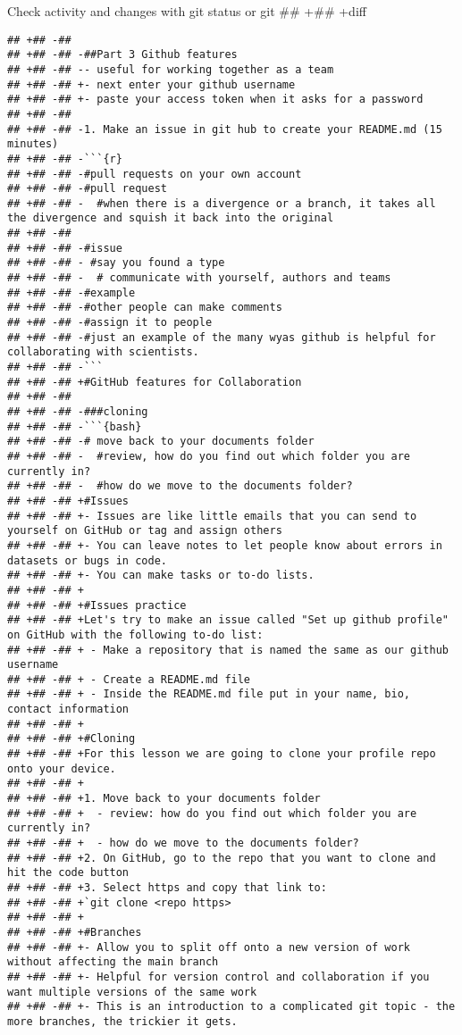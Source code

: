 \documentclass[ignorenonframetext,]{beamer}
\begin{document}
\begin{frame}[fragile]{Check activity and changes with git status or git
## +## +diff}
\begin{verbatim}
## +## -##  
## +## -## -##Part 3 Github features
## +## -## -- useful for working together as a team
## +## -## +- next enter your github username
## +## -## +- paste your access token when it asks for a password
## +## -##  
## +## -## -1. Make an issue in git hub to create your README.md (15 minutes)
## +## -## -```{r}
## +## -## -#pull requests on your own account 
## +## -## -#pull request 
## +## -## -  #when there is a divergence or a branch, it takes all the divergence and squish it back into the original
## +## -##  
## +## -## -#issue
## +## -## - #say you found a type
## +## -## -  # communicate with yourself, authors and teams 
## +## -## -#example
## +## -## -#other people can make comments
## +## -## -#assign it to people
## +## -## -#just an example of the many wyas github is helpful for collaborating with scientists.
## +## -## -```
## +## -## +#GitHub features for Collaboration
## +## -##  
## +## -## -###cloning
## +## -## -```{bash}
## +## -## -# move back to your documents folder
## +## -## -  #review, how do you find out which folder you are currently in? 
## +## -## -  #how do we move to the documents folder? 
## +## -## +#Issues
## +## -## +- Issues are like little emails that you can send to yourself on GitHub or tag and assign others
## +## -## +- You can leave notes to let people know about errors in datasets or bugs in code. 
## +## -## +- You can make tasks or to-do lists. 
## +## -## +
## +## -## +#Issues practice 
## +## -## +Let's try to make an issue called "Set up github profile" on GitHub with the following to-do list: 
## +## -## + - Make a repository that is named the same as our github username
## +## -## + - Create a README.md file
## +## -## + - Inside the README.md file put in your name, bio, contact information
## +## -## +
## +## -## +#Cloning
## +## -## +For this lesson we are going to clone your profile repo onto your device. 
## +## -## +
## +## -## +1. Move back to your documents folder 
## +## -## +  - review: how do you find out which folder you are currently in? 
## +## -## +  - how do we move to the documents folder? 
## +## -## +2. On GitHub, go to the repo that you want to clone and hit the code button
## +## -## +3. Select https and copy that link to: 
## +## -## +`git clone <repo https>
## +## -## +
## +## -## +#Branches
## +## -## +- Allow you to split off onto a new version of work without affecting the main branch 
## +## -## +- Helpful for version control and collaboration if you want multiple versions of the same work
## +## -## +- This is an introduction to a complicated git topic - the more branches, the trickier it gets. 

\end{verbatim}
\end{frame}
\end{document}
